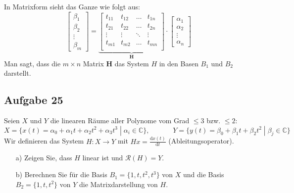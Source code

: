 \documentclass[11pt]{article}
\begin{document}
In Matrixform sieht das Ganze wie folgt aus:
$$\begin{bmatrix}
    \beta_1 \\ \beta_2 \\ \vdots \\ \beta_m
\end{bmatrix} = \underbrace{\begin{bmatrix}
    t_{11} & t_{12} & \dots & t_{1n} \\
    t_{21} & t_{22} & \dots & t_{2n} \\
    \vdots & \vdots & \ddots & \vdots \\
    t_{m1} & t_{m2} & \dots & t_{mn} \\
\end{bmatrix}}_{\mathbf{H}} \cdot \begin{bmatrix}
    \alpha_1 \\ \alpha_2 \\ \vdots \\ \alpha_n
\end{bmatrix}$$
Man sagt, dass die $m \times n$ Matrix $\mathbf{H}$ das System $H$ in den Basen $B_1$ und $B_2$ darstellt.

\vfill \null
\pagebreak

\subsection*{Aufgabe 25}
\vspace*{-0.5cm}
Seien $X$ und $Y$ die linearen Räume aller Polynome vom Grad $\leq 3$ bzw. $\leq 2$:
$$X = \{ x(t) = \alpha_0 + \alpha_1 t + \alpha_2 t^2 + \alpha_3 t^3 \; | \; \alpha_i \in \mathbb{C} \}, \hspace{40pt} Y = \{ y(t) = \beta_0 + \beta_1 t + \beta_2 t^2 \; | \; \beta_j \in \mathbb{C} \}$$
Wir definieren das System $H:X \to Y$ mit $Hx = \frac{\text{d}x(t)}{\text{d}t}$ (Ableitungsoperator).
\vspace*{-0.5cm}
\begin{itemize}
    \item[a)] Zeigen Sie, dass $H$ linear ist und $\mathcal{R}(H) = Y$.
    \item[b)] Berechnen Sie für die Basis $B_1 = \{1, t, t^2, t^3\}$ von $X$ und die Basis $B_2 = \{ 1, t, t^2 \}$ von $Y$ die Matrixdarstellung von $H$.
\end{itemize}
\vspace*{-0.5cm}
\end{document}
